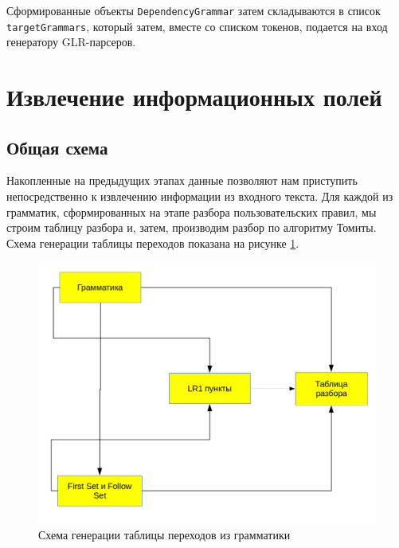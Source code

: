 Сформированные объекты \lstinline{DependencyGrammar} затем складываются в список \lstinline{targetGrammars}, который затем, вместе со списком токенов, подается на вход генератору GLR-парсеров.

\section{Извлечение информационных полей}
\subsection{Общая схема}
Накопленные на предыдущих этапах данные позволяют нам приступить непосредственно к извлечению информации из входного текста. Для каждой из грамматик, сформированных на этапе разбора пользовательских правил, мы строим таблицу разбора и, затем, производим разбор по алгоритму Томиты. Схема генерации таблицы переходов показана на рисунке \ref{fig:ParserTableGen}.
\begin{figure}%
\centering
\includegraphics[width=\textwidth]{img/ParserTable.png}
\caption{Схема генерации таблицы переходов из грамматики}
\label{fig:ParserTableGen}
\end{figure}

